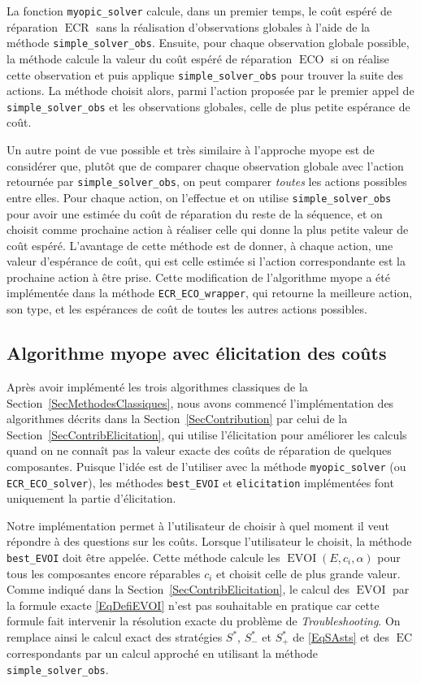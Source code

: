 \documentclass[a4paper,11pt]{article}
\theoremstyle{plain}
\theoremstyle{definition}
\DeclareMathOperator{\ECO}{ECO}
\DeclareMathOperator{\ECR}{ECR}
\DeclareMathOperator{\EC}{EC}
\DeclareMathOperator{\EVOI}{EVOI}
\begin{document}
La fonction \texttt{myopic\_solver} calcule, dans un premier temps, le coût espéré de réparation $\ECR$ sans la réalisation d'observations globales à l'aide de la méthode \texttt{simple\_solver\_obs}. Ensuite, pour chaque observation globale possible, la méthode calcule la valeur du coût espéré de réparation $\ECO$ si on réalise cette observation et puis applique \texttt{simple\_solver\_obs} pour trouver la suite des actions. La méthode choisit alors, parmi l'action proposée par le premier appel de \texttt{simple\_solver\_obs} et les observations globales, celle de plus petite espérance de coût.

Un autre point de vue possible et très similaire à l'approche myope est de considérer que, plutôt que de comparer chaque observation globale avec l'action retournée par \texttt{simple\_solver\_obs}, on peut comparer \emph{toutes} les actions possibles entre elles. Pour chaque action, on l'effectue et on utilise \texttt{simple\_solver\_obs} pour avoir une estimée du coût de réparation du reste de la séquence, et on choisit comme prochaine action à réaliser celle qui donne la plus petite valeur de coût espéré. L'avantage de cette méthode est de donner, à chaque action, une valeur d'espérance de coût, qui est celle estimée si l'action correspondante est la prochaine action à être prise. Cette modification de l'algorithme myope a été implémentée dans la méthode \texttt{ECR\_ECO\_wrapper}, qui retourne la meilleure action, son type, et les espérances de coût de toutes les autres actions possibles.

\subsection{Algorithme myope avec élicitation des coûts}
\label{SecImplElicitation}

Après avoir implémenté les trois algorithmes classiques de la Section~\ref{SecMethodesClassiques}, nous avons commencé l'implémentation des algorithmes décrits dans la Section~\ref{SecContribution} par celui de la Section~\ref{SecContribElicitation}, qui utilise l'élicitation pour améliorer les calculs quand on ne connaît pas la valeur exacte des coûts de réparation de quelques composantes. Puisque l'idée est de l'utiliser avec la méthode \texttt{myopic\_solver} (ou \texttt{ECR\_ECO\_solver}), les méthodes \texttt{best\_EVOI} et \texttt{elicitation} implémentées font uniquement la partie d'élicitation.

Notre implémentation permet à l'utilisateur de choisir à quel moment il veut répondre à des questions sur les coûts. Lorsque l'utilisateur le choisit, la méthode \texttt{best\_EVOI} doit être appelée. Cette méthode calcule les $\EVOI(E, c_i, \alpha)$ pour tous les composantes encore réparables $c_i$ et choisit celle de plus grande valeur. Comme indiqué dans la Section~\ref{SecContribElicitation}, le calcul des $\EVOI$ par la formule exacte \eqref{EqDefiEVOI} n'est pas souhaitable en pratique car cette formule fait intervenir la résolution exacte du problème de \emph{Troubleshooting}. On remplace ainsi le calcul exact des stratégies $S^\ast$, $S_-^\ast$ et $S_+^\ast$ de \eqref{EqSAsts} et des $\EC$ correspondants par un calcul approché en utilisant la méthode \texttt{simple\_solver\_obs}.
\end{document}
